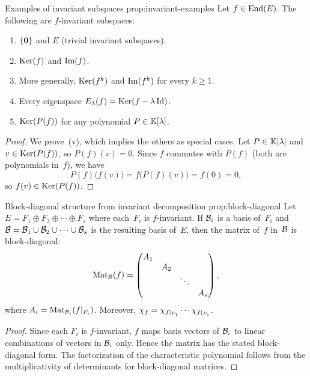 \begin{proposition}{Examples of invariant subspaces}%
{prop:invariant-examples}
Let $f \in \operatorname{End}(E)$.  The following are $f$-invariant subspaces:
\begin{enumerate}[label=(\roman*)]
  \item $\left\{\mathbf{0}\right\}$ and $E$ (trivial invariant subspaces).
  \item $\operatorname{Ker}(f)$ and $\operatorname{Im}(f)$.
  \item More generally, $\operatorname{Ker}(f^k)$ and $\operatorname{Im}(f^k)$ for every $k \geq 1$.
  \item Every eigenspace $E_\lambda(f) = \operatorname{Ker}(f - \lambda\operatorname{Id})$.
  \item $\operatorname{Ker}(P(f))$ for any polynomial $P \in {\mathbb{K}}[\lambda]$.
\end{enumerate}
\end{proposition}

\begin{proof}
We prove~(v), which implies the others as special cases.  Let
$P \in {\mathbb{K}}[\lambda]$ and $v \in \operatorname{Ker}(P(f))$, so $P(f)(v) = 0$.
Since $f$ commutes with $P(f)$ (both are polynomials in~$f$), we
have
\[
  P(f)\bigl(f(v)\bigr) = f\bigl(P(f)(v)\bigr) = f(0) = 0,
\]
so $f(v) \in \operatorname{Ker}(P(f))$.
\end{proof}

\begin{proposition}{Block-diagonal structure from invariant decomposition}%
{prop:block-diagonal}
Let $E = F_1 \oplus F_2 \oplus \cdots \oplus F_s$ where each~$F_i$ is
$f$-invariant.  If ${\mathcal{B}}_i$ is a basis of~$F_i$ and
${\mathcal{B}} = {\mathcal{B}}_1 \cup {\mathcal{B}}_2 \cup \cdots \cup {\mathcal{B}}_s$ is the resulting
basis of~$E$, then the matrix of~$f$ in~${\mathcal{B}}$ is block-diagonal:
\[
  \operatorname{Mat}_{\mathcal{B}}(f) = \begin{pmatrix}
    A_1 &        &        \\
        & A_2    &        \\
        &        & \ddots \\
        &        &        & A_s
  \end{pmatrix},
\]
where $A_i = \operatorname{Mat}_{{\mathcal{B}}_i}(f{|_{F_i}})$.
Moreover, $\chi_f = \chi_{f{|_{F_1}}} \cdots
\chi_{f{|_{F_s}}}$.
\end{proposition}

\begin{proof}
Since each $F_i$ is $f$-invariant, $f$ maps basis vectors of
${\mathcal{B}}_i$ to linear combinations of vectors in ${\mathcal{B}}_i$ only.  Hence
the matrix has the stated block-diagonal form.  The factorization
of the characteristic polynomial follows from the multiplicativity
of determinants for block-diagonal matrices.
\end{proof}


